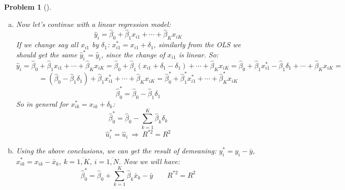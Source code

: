 \documentclass[12pt,a4]{article}
\newtheorem{problem}{Problem}
\newtheorem{solution}{Solution to the problem}
\newcommand{\bx}{{\mathbf x}}
\begin{document}
\begin{problem}[]
\begin{enumerate}[(a)]
\item Now let's continue with a linear regression model:
\[
\hat y_i = \hat \beta_0 + \hat \beta_1 x_{i1} + \cdots + \hat \beta_K x_{iK}
\]
If we change say all $x_{i1}$ by $\delta_1$: $x^*_{i1} = x_{i1} + \delta_1$, similarly from the OLS we should get the same $\hat y^*_i = \hat y_i$, since the change of $x_{i1}$ is linear. So:
\[
\hat y_i = \hat \beta_0 + \hat \beta_1 x_{i1} + \cdots + \hat \beta_K x_{iK} = \hat \beta_0 + \hat \beta_1 (x_{i1} + \delta_1 - \delta_1) + \cdots + \hat \beta_K x_{iK} = \hat \beta_0 + \hat \beta_1 x^*_{i1} - \hat \beta_1\delta_1 + \cdots + \hat \beta_K x_{iK} =
\]
\[
 = (\hat \beta_0 - \hat \beta_1\delta_1) + \hat \beta_1 x^*_{i1} + \cdots + \hat \beta_K x_{iK} = \hat \beta^*_0 + \hat \beta^*_1 x^*_{i1} + \cdots + \hat \beta^*_K x_{iK}
\]
\[
\hat \beta^*_0  = \hat \beta_0 - \hat \beta_1\delta_1
\]
So in general for $x^*_{ik} = x_{ik} + \delta_k$:
\[
\hat \beta^*_0 = \hat \beta_0 - \sum_{k=1}^K \hat \beta_k \delta_k
\]
\[
\hat u^*_i = \hat u_i
~\Rightarrow~
R^{*2} = R^2
\]
\item Using the above conclusions, we can get the result of demeaning: $y^*_i = y_i - \bar y$, $x^*_{ik} = x_{ik} - \bar x_k$, $k=\overline{1,K}$, $i=\overline{1,N}$. Now we will have:
\[
\hat \beta^*_0 = \hat \beta_0 + \sum_{k=1}^K \hat \beta_k \bar x_k - \bar y
\qquad
R^{*2} = R^2
\]
\end{enumerate}	
\end{problem}
% 
\end{document}

